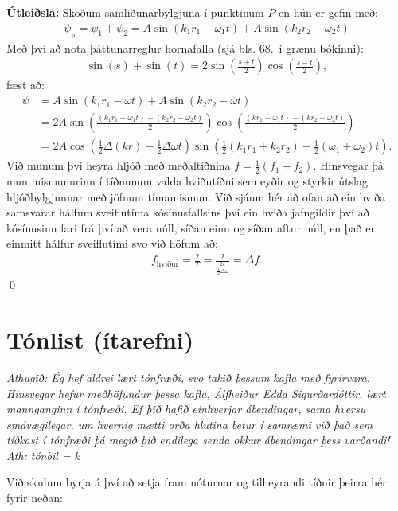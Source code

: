 \ifdefined \wholebook \else\documentclass[oneside]{book}\usepackage{EdlBook}\graphicspath{{figures/}}
\begin{document}
\textbf{Útleiðsla:} Skoðum samliðunarbylgjuna í punktinum $P$ en hún er gefin með:
\begin{align*}
    \psi_{_\text{P}} = \psi_1 + \psi_2 = A \sin(k_1 r_1 - \omega_1 t) +  A \sin(k_2 r_2 - \omega_2 t)
\end{align*}
Með því að nota þáttunarreglur hornafalla (sjá bls. 68.~í grænu bókinni):
\begin{align*}
    \sin(s) + \sin(t) = 2\sin(\frac{s+t}{2})\cos(\frac{s-t}{2}),
\end{align*}
fæst að:
\vspace{-0.75cm}
\begin{align*}
    \psi &= A \sin(k_1 r_1 - \omega t) +  A \sin(k_2 r_2 - \omega t) \\
    &= 2A\sin(\frac{\left(k_1r_1 - \omega_1 t\right) + \left(k_2 r_2 -\omega_2 t\right)}{2})\cos(\frac{\left( k r_1 - \omega_1 t \right) - \left( kr_2 - \omega_2 t \right)}{2}) \\
    &= 2A\cos(\frac{1}{2}\Delta(kr) - \frac{1}{2}\Delta \omega t)\sin(\frac{1}{2}(k_1r_1+k_2r_2)-\frac{1}{2}(\omega_1+\omega_2) t).
\end{align*}
Við munum því heyra hljóð með meðaltíðnina $f = \frac{1}{2}(f_1 + f_2)$. Hinsvegar þá mun mismunurinn í tíðnunum valda hviðutíðni sem eyðir og styrkir útslag hljóðbylgjunnar með jöfnum tímamismun. Við sjáum hér að ofan að ein hviða samsvarar hálfum sveiflutíma kósínusfallsins því ein hviða jafngildir því að kósínusinn fari frá því að vera núll, síðan einn og síðan aftur núll, en það er einmitt hálfur sveiflutími svo við höfum að:
\begin{align*}
    f_{\text{hviður}} = \frac{2}{T} = \frac{2}{\frac{2\pi}{\frac{1}{2}\Delta \omega}} = \Delta f.
\end{align*}
\qed


\newpage

\section{Tónlist (ítarefni)} 

\textit{Athugið: Ég hef aldrei lært tónfræði, svo takið þessum kafla með fyrirvara. Hinsvegar hefur meðhöfundur þessa kafla, Álfheiður Edda Sigurðardóttir, lært mannganginn í tónfræði. Ef þið hafið einhverjar ábendingar, sama hversu smávægilegar, um hvernig mætti orða hlutina betur í samræmi við það sem tíðkast í tónfræði þá megið þið endilega senda okkur ábendingar þess varðandi! Ath: tónbil = k}


Við skulum byrja á því að setja fram nóturnar og tilheyrandi tíðnir þeirra hér fyrir neðan:
\end{document}
